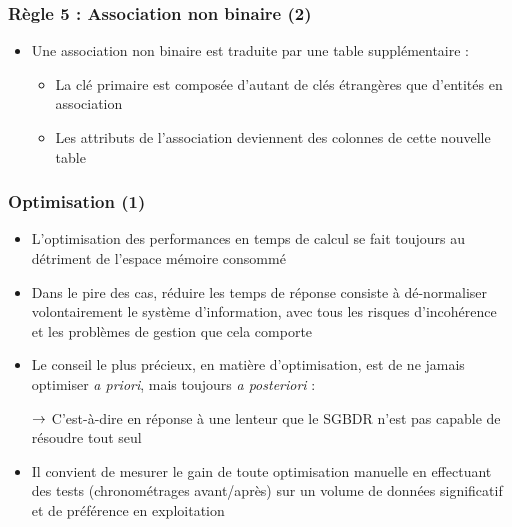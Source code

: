 \begin{frame}
  \frametitle{Règle 5 : Association non binaire (2)}
  \begin{itemize}
    \item Une association non binaire est traduite par une table supplémentaire :
      \begin{itemize}
        \item La clé primaire est composée d'autant de clés étrangères que d'entités en association
        \item Les attributs de l'association deviennent des colonnes de cette nouvelle table
      \end{itemize}
  \end{itemize}
\end{frame}


\begin{frame}
  \frametitle{Optimisation (1)}
  \begin{itemize}
    \item L'optimisation des performances en temps de calcul se fait toujours au détriment de l'espace mémoire
      consommé
    \item Dans le pire des cas, réduire les temps de réponse consiste à dé-normaliser volontairement le
      système d'information, avec tous les risques d'incohérence et les problèmes de gestion que cela
      comporte
    \item Le conseil le plus précieux, en matière d'optimisation, est de ne jamais optimiser \emph{a priori},
      mais toujours \emph{a posteriori} :
    \item[$\rightarrow$] C'est-à-dire en réponse à une lenteur que le SGBDR n'est pas capable de résoudre tout seul
    \item Il convient de mesurer le gain de toute optimisation manuelle en effectuant des tests
      (chronométrages avant/après) sur un volume de données significatif et de préférence en exploitation
  \end{itemize}
\end{frame}


